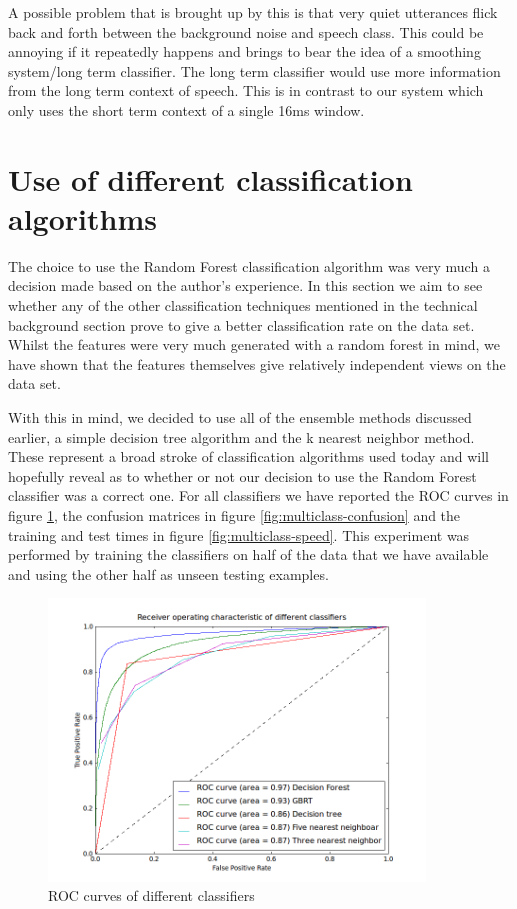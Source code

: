 \documentclass[ %
                    author={Sam Phippen},
                supervisor={Dr. Rafal Bogacz},
                     title={Real time voice activity detectors in noisy personal computing environments},
                  subtitle={},
                    degree={MEng},
                      year={2012} ]{thesis}
\begin{document}
A possible problem that is brought up by this is that very quiet utterances
flick back and forth between the background noise and speech class. This could
be annoying if it repeatedly happens and brings to bear the idea of a smoothing
system/long term classifier. The long term classifier would use more
information from the long term context of speech. This is in contrast to our
system which only uses the short term context of a single 16ms window.

\section{Use of different classification algorithms}

The choice to use the Random Forest classification algorithm was very much a
decision made based on the author's experience. In this section we aim to see
whether any of the other classification techniques mentioned in the technical
background section prove to give a better classification rate on the data set.
Whilst the features were very much generated with a random forest in mind, we
have shown that the features themselves give relatively independent views on
the data set.

With this in mind, we decided to use all of the ensemble methods discussed
earlier, a simple decision tree algorithm and the k nearest neighbor method.
These represent a broad stroke of classification algorithms used today and will
hopefully reveal as to whether or not our decision to use the Random Forest
classifier was a correct one. For all classifiers we have reported the ROC
curves in figure \ref{fig:multiclass-roc}, the confusion matrices in
figure \ref{fig:multiclass-confusion} and the training and test times in
figure \ref{fig:multiclass-speed}. This experiment was performed by training the
classifiers on half of the data that we have available and using the other half
as unseen testing examples.

\begin{figure}
    \includegraphics[width=10cm]{roc_different.png}
    \caption{ROC curves of different classifiers}
    \label{fig:multiclass-roc}
\end{figure}
\end{document}
